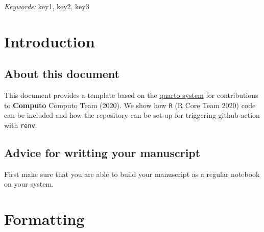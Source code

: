 \documentclass[
  11pt,
  a4paper,
]{article}
\renewcommand*\contentsname{Table of contents}
\newcommand\contentsname{Table of contents}
\theoremstyle{plain}
\theoremstyle{remark}
\begin{document}
\noindent%
{\it Keywords:} key1, key2, key3
\vfill
\ifdefined\Shaded\renewenvironment{Shaded}{\begin{tcolorbox}[enhanced, borderline west={3pt}{0pt}{shadecolor}, frame hidden, sharp corners, breakable, boxrule=0pt, interior hidden]}{\end{tcolorbox}}\fi





\def\shadecolor{\color{shadecolor}}



\renewcommand*\contentsname{Contents}
{
\hypersetup{linkcolor=}
\setcounter{tocdepth}{3}
\tableofcontents
}
\hypertarget{introduction}{%
\section{Introduction}\label{introduction}}

\hypertarget{about-this-document}{%
\subsection{About this document}\label{about-this-document}}

This document provides a template based on the
\href{https://quarto.org/}{quarto system} for contributions to
\textbf{Computo} Computo Team (2020). We show how \texttt{R} (R Core
Team 2020) code can be included and how the repository can be set-up for
triggering github-action with \texttt{renv}.

\hypertarget{advice-for-writting-your-manuscript}{%
\subsection{Advice for writting your
manuscript}\label{advice-for-writting-your-manuscript}}

First make sure that you are able to build your manuscript as a regular
notebook on your system.

\hypertarget{formatting}{%
\section{Formatting}\label{formatting}}
\end{document}
